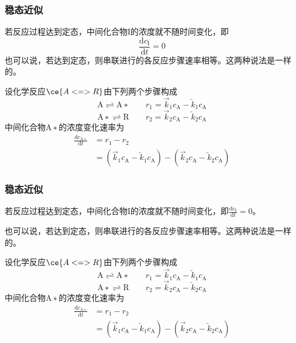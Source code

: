 \documentclass[dvipsnames, svgnames, x11names]{beamer}
\begin{document}
\begin{frame}
    \frametitle{稳态近似}
    \begin{minipage}{0.48\linewidth}
        若反应过程达到定态，中间化合物I的浓度就不随时间变化，即
        \[
            \frac{\mathrm{d}c_\mathrm{I}}{\mathrm{d}t}=0
        \]
        也可以说，若达到定态，则串联进行的各反应步骤速率相等。这两种说法是一样的。
    \end{minipage}\hfill
    \begin{minipage}{0.48\linewidth}
        设化学反应$\ce{A <=> R}$由下列两个步骤构成
        \[
            \mathrm{A} \rightleftharpoons \mathrm{A∗} \qquad r_1=\overrightarrow{k}_1c_\mathrm{A}-\overleftarrow{k}_1c_\mathrm{A}
        \]
        \[
            \mathrm{A∗} \rightleftharpoons \mathrm{R} \qquad r_2=\overrightarrow{k}_2c_\mathrm{A}-\overleftarrow{k}_2c_\mathrm{A}
        \]
        中间化合物$\mathrm{A∗}$的浓度变化速率为
        \[
            \begin{aligned}
                \frac{\mathrm{d}c_\mathrm{A∗}}{\mathrm{d}t}&=r_1-r_2 \\
                &=(\overrightarrow{k}_1c_\mathrm{A}-\overleftarrow{k}_1c_\mathrm{A})-(\overrightarrow{k}_2c_\mathrm{A}-\overleftarrow{k}_2c_\mathrm{A})
            \end{aligned}
        \] 
    \end{minipage}
\end{frame}


\begin{frame}
    \frametitle{稳态近似}
    若反应过程达到定态，中间化合物I的浓度就不随时间变化，即$\frac{\mathrm{d}c_\mathrm{I}}{\mathrm{d}t}=0$。
    
    也可以说，若达到定态，则串联进行的各反应步骤速率相等。这两种说法是一样的。

    设化学反应$\ce{A <=> R}$由下列两个步骤构成
        \[
            \mathrm{A} \rightleftharpoons \mathrm{A∗} \qquad r_1=\overrightarrow{k}_1c_\mathrm{A}-\overleftarrow{k}_1c_\mathrm{A}
        \]
        \[
            \mathrm{A∗} \rightleftharpoons \mathrm{R} \qquad r_2=\overrightarrow{k}_2c_\mathrm{A}-\overleftarrow{k}_2c_\mathrm{A}
        \]
        中间化合物$\mathrm{A∗}$的浓度变化速率为
        \[
            \begin{aligned}
                \frac{\mathrm{d}c_\mathrm{A∗}}{\mathrm{d}t}&=r_1-r_2 \\
                &=(\overrightarrow{k}_1c_\mathrm{A}-\overleftarrow{k}_1c_\mathrm{A})-(\overrightarrow{k}_2c_\mathrm{A}-\overleftarrow{k}_2c_\mathrm{A})
            \end{aligned}
        \] 
\end{frame}
\end{document}
